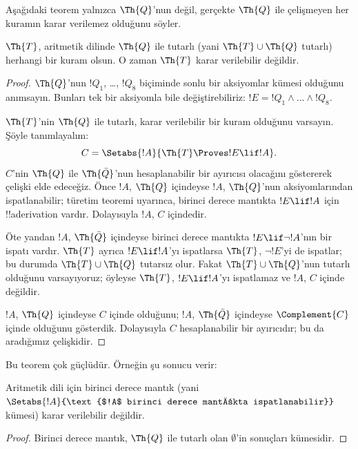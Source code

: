 \documentclass[../../../include/open-logic-section]{subfiles}
\begin{document}


Aşağıdaki teorem yalnızca $\Th{Q}$'nun değil, gerçekte $\Th{Q}$ ile
çelişmeyen her kuramın karar verilemez olduğunu söyler.

\begin{thm}
$\Th{T}$, aritmetik dilinde $\Th{Q}$ ile tutarlı (yani
$\Th{T} \cup \Th{Q}$ tutarlı) herhangi bir kuram olsun. O zaman $\Th{T}$
karar verilebilir değildir.
\end{thm}

\begin{proof}
$\Th{Q}$'nun $!Q_1$, \dots, $!Q_8$ biçiminde sonlu bir aksiyomlar kümesi
olduğunu anımsayın. Bunları tek bir aksiyomla bile değiştirebiliriz:
$!E = !Q_1 \land \dots \land !Q_8$.

$\Th{T}$'nin $\Th{Q}$ ile tutarlı, karar verilebilir bir kuram olduğunu
varsayın. Şöyle tanımlayalım:
\[
C = \Setabs{!A}{\Th{T} \Proves !E \lif !A}.
\]
$C$'nin $\Th{Q}$ ile $\Th{\bar Q}$'nun hesaplanabilir bir ayırıcısı olacağını
göstererek çelişki elde edeceğiz. Önce $!A$, $\Th{Q}$ içindeyse $!A$,
$\Th{Q}$'nun aksiyomlarından ispatlanabilir; türetim teoremi uyarınca,
birinci derece mantıkta $!E \lif !A$ için !!a{derivation} vardır. Dolayısıyla
$!A$, $C$ içindedir.

Öte yandan $!A$, $\Th{\bar Q}$ içindeyse birinci derece mantıkta
$!E \lif \lnot !A$'nın bir ispatı vardır. $\Th{T}$ ayrıca
$!E \lif !A$'yı ispatlarsa $\Th{T}$, $\lnot !E$'yi de ispatlar; bu durumda
$\Th{T} \cup \Th{Q}$ tutarsız olur. Fakat $\Th{T} \cup \Th{Q}$'nun tutarlı
olduğunu varsayıyoruz; öyleyse $\Th{T}$, $!E \lif !A$'yı ispatlamaz ve
$!A$, $C$ içinde değildir.

$!A$, $\Th{Q}$ içindeyse $C$ içinde olduğunu; $!A$, $\Th{\bar Q}$ içindeyse
$\Complement{C}$ içinde olduğunu gösterdik. Dolayısıyla $C$ hesaplanabilir
bir ayırıcıdır; bu da aradığımız çelişkidir.
\end{proof}

Bu teorem çok güçlüdür. Örneğin şu sonucu verir:

\begin{cor}
  Aritmetik dili için birinci derece mantık (yani
  $\Setabs{!A}{\text{$!A$ birinci derece mantıkta ispatlanabilir}}$ kümesi)
  karar verilebilir değildir.
\end{cor}

\begin{proof}
Birinci derece mantık, $\Th{Q}$ ile tutarlı olan $\emptyset$'in sonuçları
kümesidir.
\end{proof}
\end{document}
